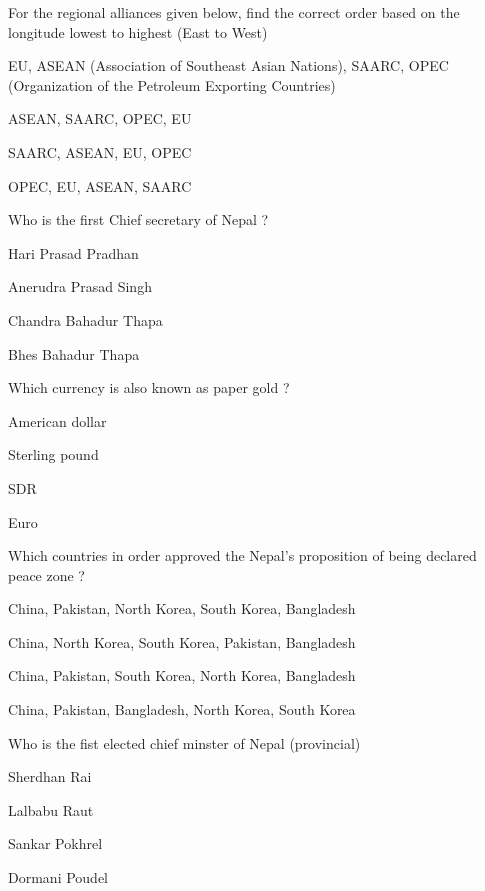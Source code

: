 \begin{questions}
\question For the regional alliances given below, find the correct order based on the longitude lowest to highest (East to West)
  \begin{items}
  \item EU, ASEAN (Association of Southeast Asian Nations), SAARC, OPEC (Organization of the Petroleum Exporting Countries)
  \item* ASEAN, SAARC, OPEC, EU
  \item SAARC, ASEAN, EU, OPEC
  \item OPEC, EU, ASEAN, SAARC
  \end{items}

\question Who is the first Chief secretary of Nepal ?
  \begin{items}
  \item Hari Prasad Pradhan
  \item Anerudra Prasad Singh
  \item* Chandra Bahadur Thapa
  \item Bhes Bahadur Thapa
  \end{items}

\question Which currency is also known as paper gold ?
  \begin{items}
  \item American dollar
  \item Sterling pound
  \item* SDR
  \item Euro
  \end{items}

\question Which countries in order approved the Nepal's proposition of being declared peace zone ?
  \begin{items}
  \item* China, Pakistan, North Korea, South Korea, Bangladesh
  \item China, North Korea, South Korea, Pakistan, Bangladesh
  \item China, Pakistan, South Korea, North Korea, Bangladesh
  \item China, Pakistan, Bangladesh, North Korea, South Korea
  \end{items}

\question Who is the fist elected chief minster of Nepal (provincial)
  \begin{items}
  \item Sherdhan Rai
  \item Lalbabu Raut
  \item Sankar Pokhrel
  \item* Dormani Poudel
  \end{items}


\end{questions}
